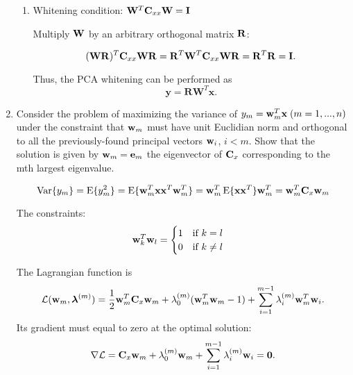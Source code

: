 \begin{enumerate}
\begin{solution}
\begin{enumerate}
    \item 
      Whitening condition: $\mathbf{W}^T\mathbf{C}_{xx}\mathbf{W}=\mathbf{I}$

      Multiply $\mathbf{W}$ by an arbitrary orthogonal matrix $\mathbf{R}$:

      \[
      (\mathbf{W}\mathbf{R})^T\mathbf{C}_{xx}\mathbf{W}\mathbf{R} =
      \mathbf{R}^T\mathbf{W}^T\mathbf{C}_{xx}\mathbf{W}\mathbf{R} =
      \mathbf{R}^T\mathbf{R} = \mathbf{I}.
      \]

      Thus, the PCA whitening can be performed as
      \[
      \mathbf{y} = \mathbf{RW}^T \mathbf{x}.
      \]
    \end{enumerate}
    
  \end{solution}

\item Consider the problem of maximizing the variance of $y_m = {\bf
    w}_m^T{\bf x}\; (m=1, ..., n)$ under the constraint that ${\bf
    w}_m$ must have unit Euclidian norm and orthogonal to all the
  previously-found principal vectors ${\bf w}_i$, $i<m$. Show that the
  solution is given by ${\bf w}_m={\bf e}_m$ the eigenvector of ${\bf
    C}_x$ corresponding to the mth largest eigenvalue.

  \begin{solution}

    \begin{equation*}
      \operatorname{Var}\{ y_m \} = \operatorname{E} \{ y_m^2 \} = \operatorname{E} \{ \mathbf{w}_m^T \mathbf{x} \mathbf{x}^T \mathbf{w}_m^T \}
      = \mathbf{w}_m^T \operatorname{E} \{ \mathbf{x} \mathbf{x}^T \} \mathbf{w}_m^T = \mathbf{w}_m^T \mathbf{C}_x \mathbf{w}_m
    \end{equation*}

    The constraints:
    \begin{equation*}
      \mathbf{w}_k^T \mathbf{w}_l = \begin{cases}1 \quad\text{if $k=l$} \\
        0 \quad\text{if $k \neq l$} \end{cases}
    \end{equation*}

    The Lagrangian function is
    \begin{equation*}
      {\cal L}(\mathbf{w}_m, \boldsymbol{\lambda}^{(m)}) = \frac{1}{2} \mathbf{w}_m^T  \mathbf{C}_x \mathbf{w}_m
      + \lambda_0^{(m)} ( \mathbf{w}_m^T \mathbf{w}_m - 1) + \sum_{i=1}^{m-1} \lambda_i^{(m)} \mathbf{w}_m^T \mathbf{w}_i.
    \end{equation*}
    Its gradient must equal to zero at the optimal solution:
    \begin{equation}
      \label{eq:prob_6_1_a}
      \nabla {\cal L} = {\bf{C}}_x \mathbf{w}_m + \lambda_0^{(m)} \mathbf{w}_m
      + \sum_{i=1}^{m-1} \lambda_i^{(m)} \mathbf{w}_i = \mathbf{0}.
    \end{equation}


\end{solution}
\end{enumerate}
